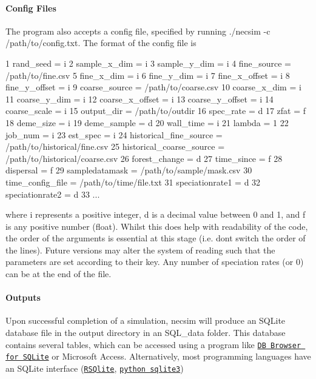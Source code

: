 \paragraph*{Config Files}

The program also accepts a config file, specified by running {\ttfamily ./necsim -\/c /path/to/config.txt}. The format of the config file is 
\begin{DoxyCode}
1 rand\_seed = i
2 sample\_x\_dim = i
3 sample\_y\_dim = i
4 fine\_source = /path/to/fine.csv
5 fine\_x\_dim = i
6 fine\_y\_dim = i
7 fine\_x\_offset = i
8 fine\_y\_offset = i
9 coarse\_source = /path/to/coarse.csv
10 coarse\_x\_dim = i
11 coarse\_y\_dim = i
12 coarse\_x\_offset = i
13 coarse\_y\_offset = i
14 coarse\_scale = i
15 output\_dir = /path/to/outdir
16 spec\_rate = d
17 zfat = f
18 deme\_size = i
19 deme\_sample = d
20 wall\_time = i
21 lambda = 1
22 job\_num = i
23 est\_spec = i
24 historical\_fine\_source = /path/to/historical/fine.csv
25 historical\_coarse\_source = /path/to/historical/coarse.csv
26 forest\_change = d
27 time\_since = f
28 dispersal = f
29 sampledatamask = /path/to/sample/mask.csv
30 time\_config\_file = /path/to/time/file.txt
31 speciationrate1 = d
32 speciationrate2 = d
33 ...
\end{DoxyCode}
 where {\ttfamily i} represents a positive integer, {\ttfamily d} is a decimal value between 0 and 1, and {\ttfamily f} is any positive number (float). Whilst this does help with readability of the code, the order of the arguments is essential at this stage (i.\+e. don\textquotesingle{}t switch the order of the lines). Future versions may alter the system of reading such that the parameters are set according to their key. Any number of speciation rates (or 0) can be at the end of the file.

\paragraph*{Outputs}

Upon successful completion of a simulation, necsim will produce an S\+Q\+Lite database file in the output directory in an S\+Q\+L\+\_\+data folder. This database contains several tables, which can be accessed using a program like \href{http://sqlitebrowser.org/}{\tt DB Browser for S\+Q\+Lite} or Microsoft Access. Alternatively, most programming languages have an S\+Q\+Lite interface (\href{https://cran.r-project.org/web/packages/RSQLite/index.html}{\tt R\+S\+Qlite}, \href{https://docs.python.org/2/library/sqlite3.html}{\tt python sqlite3})


